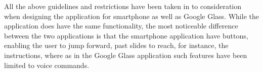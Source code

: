 All the above guidelines and restrictions have been taken in to consideration when designing the application for smartphone as well as Google Glass. While the application does have the same functionality, the most noticeable difference between the two applications is that the smartphone application have buttons, enabling the user to jump forward, past slides to reach, for instance, the instructions, where as in the Google Glass application such features have been limited to voice commands.